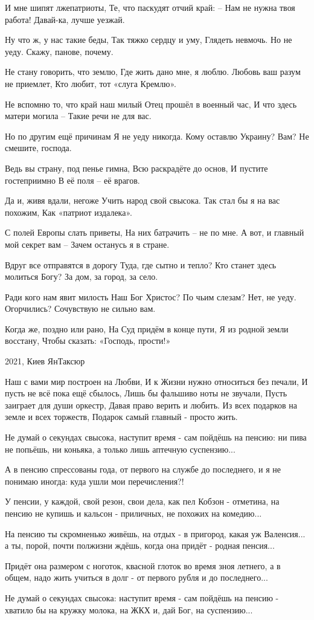 И мне шипят лжепатриоты,
Те, что паскудят отчий край:
– Нам не нужна твоя работа!
Давай-ка, лучше уезжай.

Ну что ж, у нас такие беды,
Так тяжко сердцу и уму,
Глядеть невмочь. Но не уеду.
Скажу, панове, почему.

Не стану говорить, что землю,
Где жить дано мне, я люблю.
Любовь ваш разум не приемлет,
Кто любит, тот «слуга Кремлю».

Не вспомню то, что край наш милый
Отец прошёл в военный час,
И что здесь матери могила – 
Такие речи не для вас.

Но по другим ещё причинам
Я не уеду никогда.
Кому оставлю Украину?
Вам? Не смешите, господа.

Ведь вы страну, под пенье гимна,
Всю раскрадёте до основ,
И пустите гостеприимно
В её поля – её врагов.

Да и, живя вдали, негоже
Учить народ свой свысока.
Так стал бы я на вас похожим,
Как «патриот издалека».

С полей Европы слать приветы,
На них батрачить – не по мне.
А вот, и главный мой секрет вам – 
Зачем останусь я в стране.

Вдруг все отправятся в дорогу
Туда, где сытно и тепло?
Кто станет здесь молиться Богу?
За дом, за город, за село.

Ради кого нам явит милость
Наш Бог Христос? По чьим слезам?
Нет, не уеду. Огорчились?
Сочувствую не сильно вам.

Когда же, поздно или рано,
На Суд придём в конце пути,
Я из родной земли восстану,
Чтобы сказать: «Господь, прости!»

2021, Киев
ЯнТаксюр


Наш с вами мир построен на Любви, 
И к Жизни нужно относиться без печали, 
И пусть не всё пока ещё сбылось, 
Лишь бы фальшиво ноты не звучали, 
Пусть заиграет для души оркестр, 
Давая право верить и любить. 
Из всех подарков на земле и всех торжеств, 
Подарок самый главный - просто жить.


Не думай о секундах свысока,
наступит время - сам пойдёшь на пенсию:
ни пива не попьёшь, ни коньяка,
а только лишь аптечную суспензию...

А в пенсию спрессованы года,
от первого на службе до последнего, 
и я не понимаю иногда:
куда ушли мои перечисления?!

У пенсии, у каждой,  свой резон,
свои дела, как пел Кобзон - отметина, 
на пенсию не купишь и кальсон - 
приличных, не похожих на комедию...

На пенсию ты скромненько живёшь, 
на отдых -  в пригород, какая уж  Валенсия...
а ты, порой, почти полжизни ждёшь,
когда она придёт -  родная пенсия...

Придёт она размером с ноготок,
квасной глоток во время зноя летнего,
а в общем, надо жить учиться в долг - 
от первого рубля и до последнего...

Не думай о секундах свысока:
наступит время - сам пойдёшь на пенсию -
хватило бы на кружку молока, на ЖКХ 
и, дай Бог, на суспензию...
